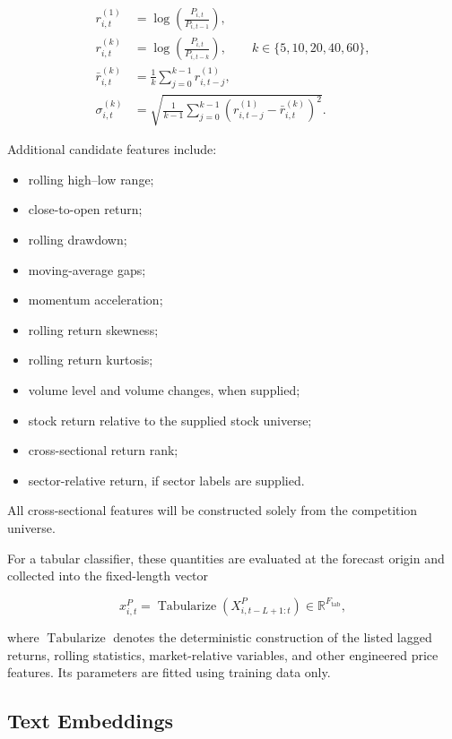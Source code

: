 \documentclass[11pt]{article}
\newcommand{\R}{\mathbb{R}}
\begin{document}
\begin{align}
r_{i,t}^{(1)}
&=
\log\left(\frac{P_{i,t}}{P_{i,t-1}}\right),\\
r_{i,t}^{(k)}
&=
\log\left(\frac{P_{i,t}}{P_{i,t-k}}\right),
\qquad
k\in\{5,10,20,40,60\},\\
\bar r_{i,t}^{(k)}
&=
\frac{1}{k}
\sum_{j=0}^{k-1}r_{i,t-j}^{(1)},\\
\sigma_{i,t}^{(k)}
&=
\sqrt{
\frac{1}{k-1}
\sum_{j=0}^{k-1}
\left(
r_{i,t-j}^{(1)}
-
\bar r_{i,t}^{(k)}
\right)^2
}.
\end{align}

Additional candidate features include:

\begin{itemize}
    \item rolling high--low range;
    \item close-to-open return;
    \item rolling drawdown;
    \item moving-average gaps;
    \item momentum acceleration;
    \item rolling return skewness;
    \item rolling return kurtosis;
    \item volume level and volume changes, when supplied;
    \item stock return relative to the supplied stock universe;
    \item cross-sectional return rank;
    \item sector-relative return, if sector labels are supplied.
\end{itemize}

All cross-sectional features will be constructed solely from the competition
universe.

For a tabular classifier, these quantities are evaluated at the forecast
origin and collected into the fixed-length vector

\begin{equation}
x^P_{i,t}
=
\operatorname{Tabularize}
\left(X^P_{i,t-L+1:t}\right)
\in\R^{F_{\mathrm{tab}}},
\end{equation}

where $\operatorname{Tabularize}$ denotes the deterministic construction of
the listed lagged returns, rolling statistics, market-relative variables, and
other engineered price features. Its parameters are fitted using training
data only.

\subsection{Text Embeddings}
\end{document}
